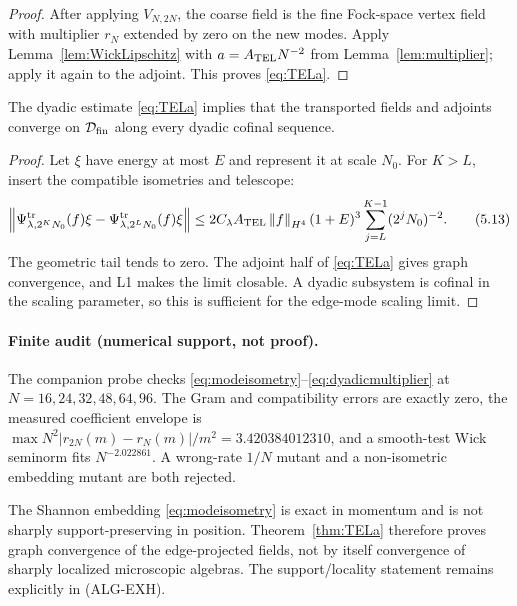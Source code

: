 \begin{proof}
After applying $V_{N,2N}$, the coarse field is the fine Fock-space
vertex field with multiplier $r_N$ extended by zero on the new modes.
Apply Lemma~\ref{lem:WickLipschitz} with
$a=A_{\rm TEL}N^{-2}$ from Lemma~\ref{lem:multiplier}; apply it again
to the adjoint.  This proves \eqref{eq:TELa}.
\end{proof}

\begin{lemma}
\label{lem:telescoping}
The dyadic estimate \eqref{eq:TELa} implies that the transported fields
and adjoints converge on $\mathcal D_{\mathrm{fin}}$ along every dyadic cofinal sequence.
\end{lemma}

\begin{proof}
Let $\xi$ have energy at most $E$ and represent it at scale $N_0$.
For $K>L$, insert the compatible isometries and telescope:
\[
\left\lVert\Psi_{\lambda,2^KN_0}^{\rm tr}(f)\xi
      -\Psi_{\lambda,2^LN_0}^{\rm tr}(f)\xi\right\rVert
\le
2C_\lambda A_{\rm TEL}\left\lVert f\right\rVert_{H^4}(1+E)^3
\sum_{j=L}^{K-1}(2^jN_0)^{-2}.
\tag{5.13}\label{eq:telestimate}
\]
The geometric tail tends to zero.  The adjoint half of
\eqref{eq:TELa} gives graph convergence, and L1 makes the limit
closable.  A dyadic subsystem is cofinal in the scaling parameter, so
this is sufficient for the edge-mode scaling limit.
\end{proof}

\paragraph{Finite audit (numerical support, not proof).}
The companion probe
checks \eqref{eq:modeisometry}--\eqref{eq:dyadicmultiplier} at
$N=16,24,32,48,64,96$.  The Gram and compatibility errors are exactly
zero, the measured coefficient envelope is
$\max N^2|r_{2N}(m)-r_N(m)|/m^2=3.420384012310$, and a smooth-test Wick
seminorm fits $N^{-2.022861}$.  A wrong-rate $1/N$ mutant and a
non-isometric embedding mutant are both rejected.

\begin{remark}
The Shannon embedding \eqref{eq:modeisometry} is exact in momentum and
is not sharply support-preserving in position.  Theorem~\ref{thm:TELa}
therefore proves graph convergence of the edge-projected fields, not by
itself convergence of sharply localized microscopic algebras.  The
support/locality statement remains explicitly in \textup{(ALG-EXH)}.
\end{remark}

